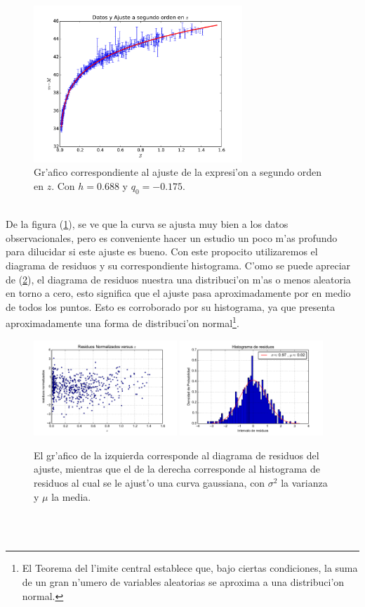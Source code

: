 \begin{figure}[h!]
  \centering
\includegraphics[width=0.7\textwidth]{fig/datos-y-ajusteq0.pdf}
 \caption{Gr'afico correspondiente al ajuste de la expresi'on a segundo orden en $z$. Con $h=0.688$ y $q_0=-0.175$.}
  \label{q000}
  \end{figure}\\
De la figura (\ref{q000}), se ve que la curva se ajusta muy bien a los datos observacionales, pero es conveniente hacer
un estudio un poco m'as profundo para dilucidar si este ajuste  es bueno. Con este propocito utilizaremos el diagrama de residuos
y su correspondiente histograma. C'omo se puede apreciar de (\ref{res}), el diagrama de residuos nuestra una distribuci'on 
m'as o menos aleatoria en torno a cero, esto significa que el ajuste pasa aproximadamente por en medio de todos los puntos. Esto
es corroborado por su histograma, ya que presenta aproximadamente una forma de distribuci'on normal\footnote{El Teorema del l'imite central establece que, bajo ciertas condiciones, la suma de un gran n'umero de variables aleatorias se aproxima a una distribuci'on normal.}. 
\begin{figure}[h!]
  \centering
\includegraphics[width=0.48\textwidth]{fig/residuosnorq0.pdf}
\includegraphics[width=0.48\textwidth]{fig/gaussq0.pdf}
 \caption{El gr'afico de la izquierda corresponde al diagrama de residuos del ajuste, mientras que el de la derecha corresponde 
 al histograma de residuos al cual se le ajust'o una curva gaussiana, con $\sigma^2$ la varianza y $\mu$ la media.}
  \label{res}
  \end{figure}\\ \\      
